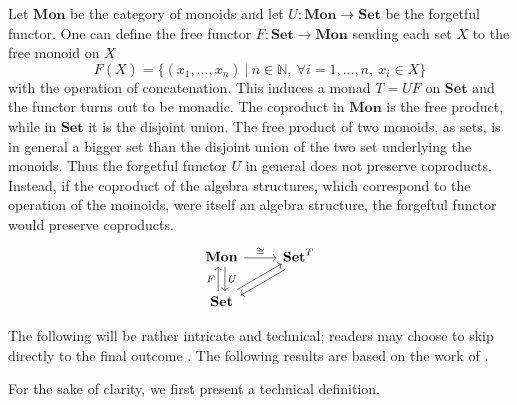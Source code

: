 \begin{rembox}{}
    \begin{ex}
        Let $\mathbf{Mon}$ be the category of monoids and let $U: \mathbf{Mon} \to \mathbf{Set}$ be the forgetful functor. One can define the free functor $F: \mathbf{Set} \to \mathbf{Mon}$ sending each set $X$ to the free monoid on $X$
        \[F(X) = \{(x_1,\ldots,x_n) \ | \ n \in \mathbb{N}, \ \forall i=1,\ldots,n, \ x_i \in X \}\]
        with the operation of concatenation. This induces a monad $T=UF$ on $\mathbf{Set}$ and the functor turns out to be monadic. The coproduct in $\mathbf{Mon}$ is the free product, while in $\mathbf{Set}$ it is the disjoint union. The free product of two monoids, as sets, is in general a bigger set than the disjoint union of the two set underlying the monoids. Thus the forgetful functor $U$ in general does not preserve coproducts. Instead, if the coproduct of the algebra structures, which correspond to the operation of the moinoids, were itself an algebra structure, the forgeftul functor would preserve coproducts.
        \[
\begin{tikzcd}
\mathbf{Mon} \arrow[r, "\cong"] \arrow[d, "U", shift left]     & \mathbf{Set}^T \arrow[ld, shift left] \\
\mathbf{Set} \arrow[u, "F", shift left] \arrow[ru, shift left] &                                      
\end{tikzcd}
        \]
    \end{ex}
\end{rembox}

The following will be rather intricate and technical; readers may choose to skip directly to the final outcome . The following results are based on the work of \cite{Linton1969}.

For the sake of clarity, we first present a technical definition.

